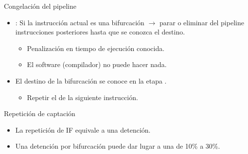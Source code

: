 \begin{frame}[t]{Congelación del pipeline}
\begin{itemize}
  \item {}: Si la instrucción actual es una bifurcación 
        $\rightarrow$ parar o eliminar del pipeline instrucciones posteriores 
        hasta que se conozca el destino.
    \begin{itemize}
      \item Penalización en tiempo de ejecución conocida.
      \item El software (compilador) no puede hacer nada.
    \end{itemize}

    \item El destino de la bifurcación se conoce en la etapa .
      \begin{itemize}
        \item Repetir el  de la siguiente instrucción.
      \end{itemize}
\end{itemize}
\end{frame}

\begin{frame}[t]{Repetición de captación}
\makebox[\textwidth][c]{

}

\begin{itemize}
  \item La repetición de IF equivale a una detención.
  \item Una detención por bifurcación puede dar lugar a una  de 10\% a 30\%.
\end{itemize}
\end{frame}

